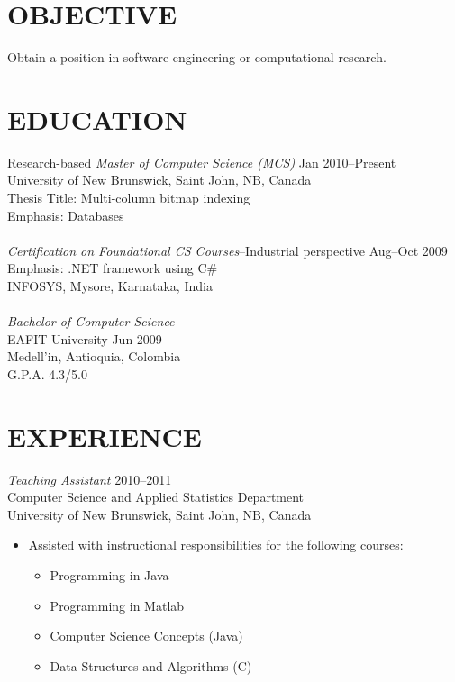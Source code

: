 \documentclass[line,margin]{res}
\begin{document}
\address{19603 Fernhaven, Katy, TX 77449}
\address{(281)-398-9692\\eduardo.gutarra@unb.ca}

 
\begin{resume}

\section{ OBJECTIVE} %
\label{sec:objective}
    Obtain a position in software engineering or computational research.

\section{ EDUCATION} %
\label{sec:education}
    Research-based {\sl Master of Computer Science (MCS)} \hfill Jan 2010--Present\\
    University of New Brunswick, Saint John, NB, Canada\\
    Thesis Title: Multi-column bitmap indexing\\
    Emphasis: Databases\\\\
    {\sl Certification on Foundational CS Courses}--Industrial perspective \hfill Aug--Oct 2009\\
    Emphasis: .NET framework using C\#\\
    INFOSYS, Mysore, Karnataka, India\\\\
    {\sl Bachelor of Computer Science}\\
    EAFIT University \hfill Jun 2009\\
    Medell\a'in, Antioquia, Colombia\\
    G.P.A. 4.3/5.0\\

\section{ EXPERIENCE} %
\label{sec:experience}

{\sl Teaching Assistant} \hfill 2010--2011\\
Computer Science and Applied Statistics Department\\
University of New Brunswick, Saint John, NB, Canada
\begin{itemize} %
    \item Assisted with instructional responsibilities for the following courses:
    \begin{itemize} \itemsep -2pt
        \item Programming in Java
        \item Programming in Matlab
        \item Computer Science Concepts (Java)
        \item Data Structures and Algorithms (C)
    \end{itemize}
\end{itemize}


\end{resume}
\end{document}

